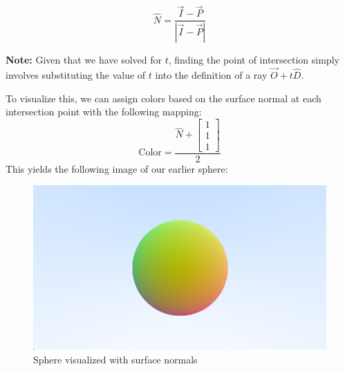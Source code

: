 $$\hat{N} = \frac{\Vec{I} - \Vec{P}}{|\Vec{I} - \Vec{P}|}$$
\begin{tcolorbox}
\textbf{Note:} Given that we have solved for $t$, finding the point of intersection simply involves substituting the value of $t$ into the definition of a ray $\Vec{O} + t\hat{D}$.
\end{tcolorbox}
\noindent
To visualize this, we can assign colors based on the surface normal at each intersection point with the following mapping:
$$\text{Color} = \frac{\hat{N} + \begin{bmatrix} 1\\ 1\\ 1 \end{bmatrix}}{2}$$
This yields the following image of our earlier sphere:
\begin{figure}[H]
    \centering
    \includegraphics[scale=0.5]{figures/SphereNormal.png}
    \caption{Sphere visualized with surface normals}
    \label{fig:sphere_normal}
\end{figure}